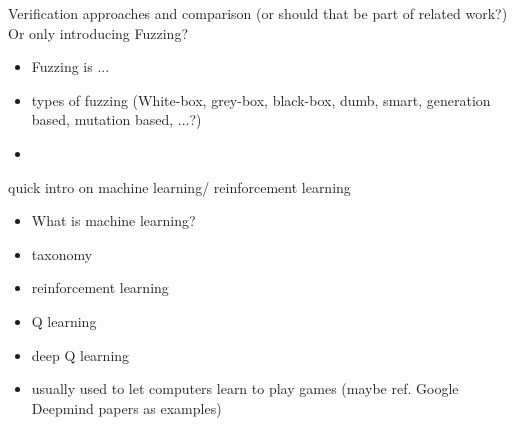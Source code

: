 Verification approaches and comparison (or should that be part of related work?) Or only introducing Fuzzing?
\begin{itemize}
    \item Fuzzing is ...
    \item types of fuzzing (White-box, grey-box, black-box, dumb, smart, generation based, mutation based, ...?)
    \item
\end{itemize}
quick intro on machine learning/ reinforcement learning
\begin{itemize}
    \item What is machine learning?
    \item taxonomy
    \item reinforcement learning
    \item Q learning
    \item deep Q learning
    \item usually used to let computers learn to play games (maybe ref. Google Deepmind papers as examples)
\end{itemize}

